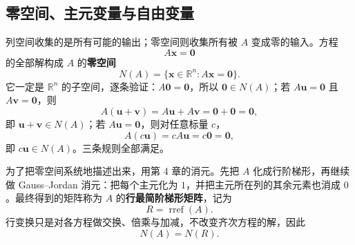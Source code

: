 \documentclass[UTF8,a4paper,12pt]{ctexart}
\numberwithin{equation}{section}
\newcommand{\R}{\mathbb{R}}
\begin{document}
	\subsection{零空间、主元变量与自由变量}
	
	列空间收集的是所有可能的输出；零空间则收集所有被 $A$ 变成零的输入。方程
	\begin{equation}\label{eq:5.13}
	A\bm{x}=\bm{0}
	\end{equation}
	的全部解构成 $A$ 的\textbf{零空间}
	\begin{equation}\label{eq:5.14}
	N(A)=\{\bm{x}\in\R^n:A\bm{x}=\bm{0}\}.
	\end{equation}
	它一定是 $\R^n$ 的子空间，逐条验证：$A\bm{0}=\bm{0}$，所以 $\bm{0}\in N(A)$；若 $A\bm{u}=\bm{0}$ 且 $A\bm{v}=\bm{0}$，则
	\begin{equation}\label{eq:5.15}
	A(\bm{u}+\bm{v})=A\bm{u}+A\bm{v}=\bm{0}+\bm{0}=\bm{0},
	\end{equation}
	即 $\bm{u}+\bm{v}\in N(A)$；若 $A\bm{u}=\bm{0}$，则对任意标量 $c$，
	\begin{equation}\label{eq:5.16}
	A(c\bm{u})=cA\bm{u}=c\bm{0}=\bm{0},
	\end{equation}
	即 $c\bm{u}\in N(A)$。三条规则全部满足。
	
	为了把零空间系统地描述出来，用第 4 章的消元。先把 $A$ 化成行阶梯形，再继续做 Gauss--Jordan 消元：把每个主元化为 $1$，并把主元所在列的其余元素也消成 $0$。最终得到的矩阵称为 $A$ 的\textbf{行最简阶梯形矩阵}，记为
	\begin{equation}\label{eq:5.17}
	R=\operatorname{rref}(A).
	\end{equation}
	行变换只是对各方程做交换、倍乘与加减，不改变齐次方程的解，因此
	\begin{equation}\label{eq:5.18}
	N(A)=N(R).
	\end{equation}
	
\end{document}

